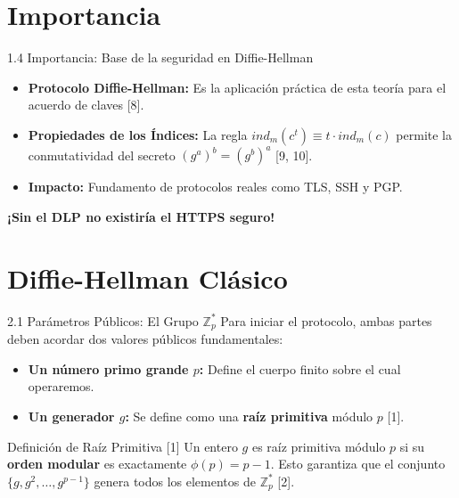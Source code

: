 \documentclass{beamer}
\begin{document}
\section{Importancia}
\begin{frame}{1.4 Importancia: Base de la seguridad en Diffie-Hellman}
    \begin{itemize}
        \item \textbf{Protocolo Diffie-Hellman:} Es la aplicación práctica de esta teoría para el acuerdo de claves [8].
        \item \textbf{Propiedades de los Índices:} La regla $ind_m(c^t) \equiv t \cdot ind_m(c)$ permite la conmutatividad del secreto $(g^a)^b = (g^b)^a$ [9, 10].
        \item \textbf{Impacto:} Fundamento de protocolos reales como TLS, SSH y PGP.
    \end{itemize}
    \begin{center}
        \textbf{¡Sin el DLP no existiría el HTTPS seguro!}
    \end{center}
\end{frame}

\section{Diffie-Hellman Clásico}
\begin{frame}{2.1 Parámetros Públicos: El Grupo $\mathbb{Z}_p^*$}
    Para iniciar el protocolo, ambas partes deben acordar dos valores públicos fundamentales:
    \begin{itemize}
        \item \textbf{Un número primo grande $p$:} Define el cuerpo finito sobre el cual operaremos.
        \item \textbf{Un generador $g$:} Se define como una \textbf{raíz primitiva} módulo $p$ [1].
    \end{itemize}
    
    \begin{block}{Definición de Raíz Primitiva [1]}
        Un entero $g$ es raíz primitiva módulo $p$ si su \textbf{orden modular} es exactamente $\phi(p) = p-1$. Esto garantiza que el conjunto $\{g, g^2, \dots, g^{p-1}\}$ genera todos los elementos de $\mathbb{Z}_p^*$ [2].
    \end{block}
    
\end{frame}
\end{document}

